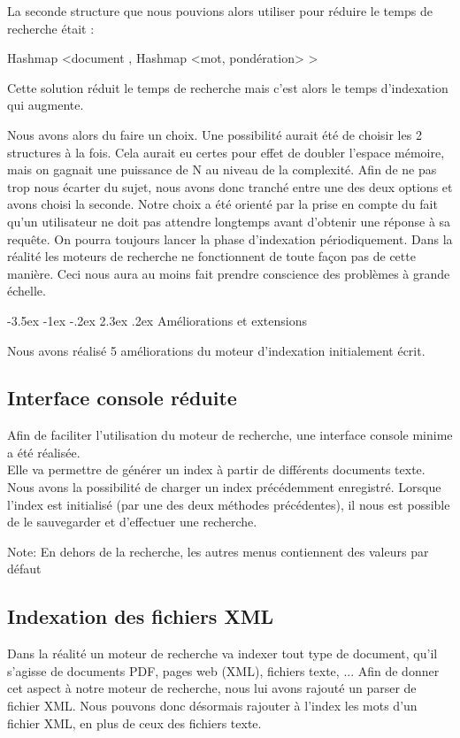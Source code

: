 \documentclass[a4paper,12pt]{article}
\makeatletter
\renewcommand\section{\@startsection {section}{1}{\z@}%
                           {-3.5ex \@plus -1ex \@minus -.2ex}%
                           {2.3ex \@plus.2ex}%
                           {\normalfont\Large\bfseries}}
\makeatother
\begin{document}
La seconde structure que nous pouvions alors utiliser pour réduire le temps de recherche était : 

Hashmap <document , Hashmap <mot, pondération> >

Cette solution réduit le temps de recherche mais c'est alors le temps d'indexation qui augmente.

Nous avons alors du faire un choix. Une possibilité aurait été de choisir les 2 structures à la fois. Cela aurait eu certes pour effet de doubler l'espace mémoire, mais on gagnait une puissance de N au niveau de la complexité.
Afin de ne pas trop nous écarter du sujet, nous avons donc tranché entre une des deux options et avons choisi la seconde. Notre choix a été orienté par la prise en compte du fait qu'un utilisateur
ne doit pas attendre longtemps avant d'obtenir une réponse à sa requête. On pourra toujours lancer la phase d'indexation périodiquement. Dans la réalité les moteurs de recherche ne fonctionnent de toute façon pas de cette manière. Ceci nous aura au moins fait prendre conscience des problèmes à grande échelle.

\section{Améliorations et extensions}

Nous avons réalisé 5 améliorations du moteur d'indexation initialement écrit.

\subsection{Interface console réduite}
Afin de faciliter l'utilisation du moteur de recherche, une interface console minime a été réalisée.\\
Elle va permettre de générer un index à partir de différents documents texte. Nous avons la possibilité de charger un index précédemment enregistré. Lorsque l'index est initialisé (par une des deux méthodes précédentes), il nous est possible de le sauvegarder et d'effectuer une recherche.

Note: En dehors de la recherche, les autres menus contiennent des valeurs par défaut

\subsection{Indexation des fichiers XML}

Dans la réalité un moteur de recherche va indexer tout type de document, qu'il s'agisse de documents PDF, pages web (XML), fichiers texte, ...
Afin de donner cet aspect à notre moteur de recherche, nous lui avons rajouté un parser de fichier XML. Nous pouvons donc désormais rajouter à l'index les mots d'un fichier XML, en plus de ceux des fichiers texte.
\end{document}
